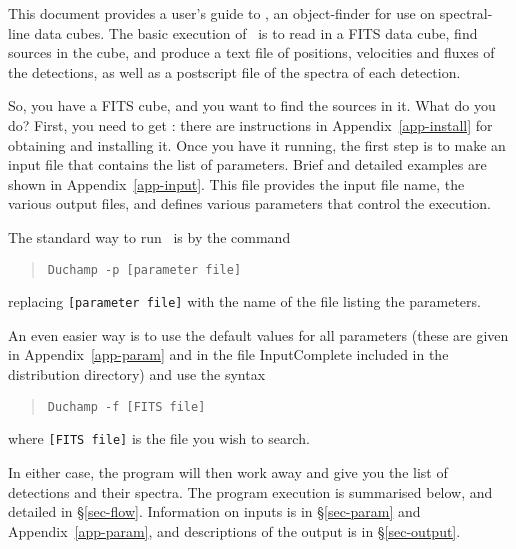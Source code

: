
This document provides a user's guide to \duchamp, an object-finder
for use on spectral-line data cubes. The basic execution of \duchamp\
is to read in a FITS data cube, find sources in the cube, and produce
a text file of positions, velocities and fluxes of the detections, as
well as a postscript file of the spectra of each detection.

So, you have a FITS cube, and you want to find the sources in it. What
do you do? First, you need to get \duchamp: there are instructions in
Appendix~\ref{app-install} for obtaining and installing it. Once you
have it running, the first step is to make an input file that contains
the list of parameters. Brief and detailed examples are shown in
Appendix~\ref{app-input}. This file provides the input file name, the
various output files, and defines various parameters that control the
execution.

The standard way to run \duchamp\ is by the command
\begin{quote}
\texttt{Duchamp -p [parameter file]}
\end{quote}
replacing \texttt{[parameter file]} with the name of the file listing
the parameters. 

An even easier way is to use the default values for all parameters
(these are given in Appendix~\ref{app-param} and in the file
InputComplete included in the distribution directory) and use the
syntax
\begin{quote}
\texttt{Duchamp -f [FITS file]}
\end{quote}
where \texttt{[FITS file]} is the file you wish to search. 

In either case, the program will then work away and give you the list
of detections and their spectra. The program execution is summarised
below, and detailed in \S\ref{sec-flow}. Information on inputs is in
\S\ref{sec-param} and Appendix~\ref{app-param}, and descriptions of
the output is in \S\ref{sec-output}.


